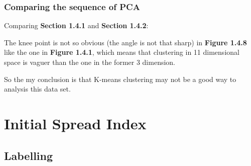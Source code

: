 \documentclass[titlepage,a4paper,12pt,thmsb]{report}
\begin{document}
\begin{center}
\begin{figure}[h]
{\par}
\end{figure}
{}
\end{center}

\newpage


\begin{center}
\begin{figure}[h]
{\par}
\end{figure}
{}
\end{center}

\begin{center}
\begin{figure}[h]
{\par}
\end{figure}
{}
\end{center}

\newpage

\subsection{Comparing the sequence of PCA}

Comparing {\bf{Section 1.4.1}} and {\bf{Section 1.4.2}}:

The knee point is not so obvious (the angle is not that sharp) in {\bf{Figure 1.4.8}} like the one in {\bf{Figure 1.4.1}}, which means that clustering in 11 dimensional space is vaguer than the one in the former 3 dimension.

So the my conclusion is that K-means clustering may not be a good way to analysis this data set.




\newpage




\chapter{Initial Spread Index}
\section{Labelling}
\end{document}
